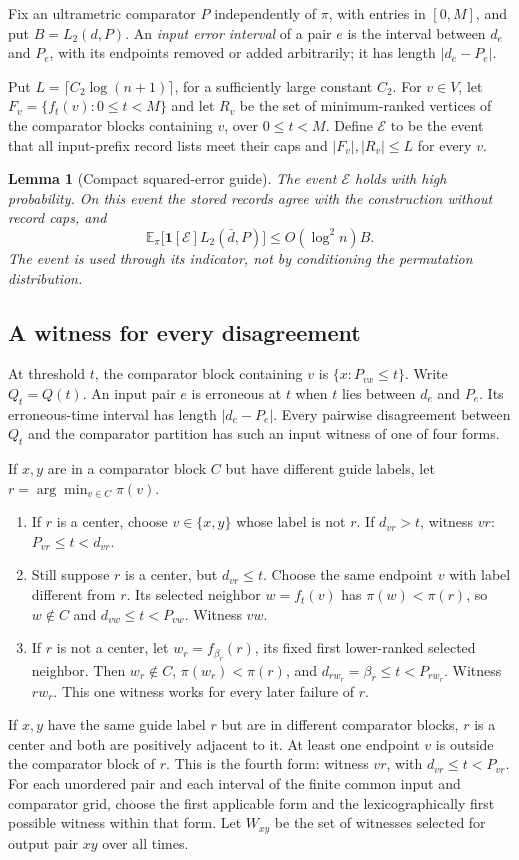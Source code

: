 \documentclass[11pt]{article}
\newtheorem{lemma}[theorem]{Lemma}
\theoremstyle{definition}
\newcommand{\E}{\mathbb E}
\newcommand{\ind}{\mathbf 1}
\begin{document}
Fix an ultrametric comparator $P$ independently of $\pi$, with entries
in $[0,M]$, and put $B=L_2(d,P)$. An \emph{input error interval} of a pair
$e$ is the interval between $d_e$ and $P_e$, with its endpoints removed
or added arbitrarily; it has length $|d_e-P_e|$.


Put $L=\lceil C_2\log(n+1)\rceil$, for a sufficiently large constant
$C_2$. For $v\in V$, let $F_v=\{f_t(v):0\le t<M\}$ and let $R_v$
be the set of minimum-ranked vertices of the comparator blocks containing
$v$, over $0\le t<M$. Define $\mathcal E$ to be the event that all input-prefix
record lists meet their caps and $|F_v|,|R_v|\le L$ for every $v$.

\begin{lemma}[Compact squared-error guide]\label{l2:lem:denoise}
The event $\mathcal E$ holds with high probability. On this event the stored records agree with the construction without record caps, and
\[
 \E_\pi\bigl[\ind[\mathcal E] L_2(\bar d,P)\bigr]
 \le O(\log^2 n)B.
\]
The event is used through its indicator, not by conditioning the permutation distribution.
\end{lemma}

\subsection{A witness for every disagreement}

At threshold $t$, the comparator block containing $v$ is $\{x:P_{vx}\le t\}$. Write $Q_t=Q(t)$.
An input pair $e$ is erroneous at $t$ when $t$ lies between $d_e$ and
$P_e$. Its erroneous-time interval has length $|d_e-P_e|$.
Every pairwise disagreement between $Q_t$ and the comparator partition
has such an input witness of one of four forms.

If $x,y$ are in a comparator block $C$ but have different guide labels,
let $r=\arg\min_{v\in C}\pi(v)$.
\begin{enumerate}[label=(\roman*),leftmargin=*]
\item If $r$ is a center, choose $v\in\{x,y\}$ whose label is not $r$.
If $d_{vr}>t$, witness $vr$: $P_{vr}\le t<d_{vr}$.
\item Still suppose $r$ is a center, but $d_{vr}\le t$. Choose the same endpoint $v$ with label different from $r$. Its selected neighbor $w=f_t(v)$ has
$\pi(w)<\pi(r)$, so $w\notin C$ and $d_{vw}\le t<P_{vw}$.
Witness $vw$.
\item If $r$ is not a center, let $w_r=f_{\beta_r}(r)$, its fixed
first lower-ranked selected neighbor. Then $w_r\notin C$,
$\pi(w_r)<\pi(r)$, and $d_{rw_r}=\beta_r\le t<P_{rw_r}$.
Witness $rw_r$. This one witness works for every later failure of $r$.
\end{enumerate}
If $x,y$ have the same guide label $r$ but are in different comparator
blocks, $r$ is a center and both are positively adjacent to it. At
least one endpoint $v$ is outside the comparator block of $r$.
This is the fourth form: witness $vr$, with $d_{vr}\le t<P_{vr}$.
For each unordered pair and each interval of the finite common input and comparator grid, choose the first applicable form and the lexicographically first possible witness within that form. Let $W_{xy}$ be the set of
witnesses selected for output pair $xy$ over all times.
\end{document}
